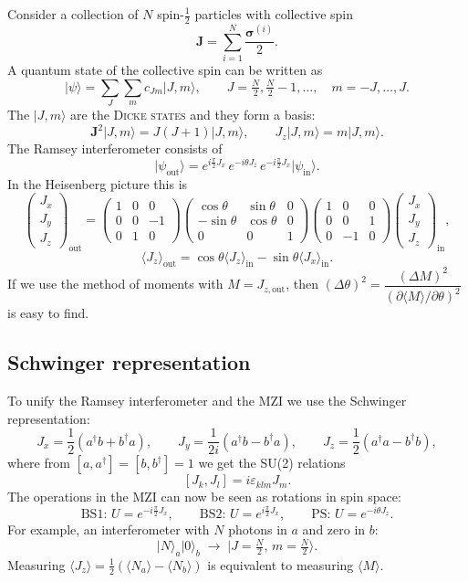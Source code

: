 \documentclass[11pt,a4paper]{article}
\newcommand{\ket}[1]{\lvert #1\rangle}
\newcommand{\expval}[1]{\langle #1\rangle}
\newcommand{\term}[1]{\textsc{#1}}
\begin{document}
Consider a collection of $N$ spin-$\frac12$ particles with collective spin
\[
  \mathbf J = \sum_{i=1}^N \frac{\bm\sigma^{(i)}}{2}.
\]
A quantum state of the collective spin can be written as
\[
  \ket\psi = \sum_J\sum_m c_{Jm}\ket{J,m}, \qquad J=\tfrac N2,\tfrac N2-1,\dots,\quad m=-J,\dots,J .
\]
The $\ket{J,m}$ are the \term{Dicke states} and they form a basis:
\[
  \mathbf J^2\ket{J,m} = J(J+1)\ket{J,m}, \qquad J_z\ket{J,m} = m\ket{J,m}.
\]
The Ramsey interferometer consists of
\[
  \ket{\psi_{\text{out}}} = e^{i\frac\pi2 J_x}\,e^{-i\theta J_z}\,e^{-i\frac\pi2 J_x}\ket{\psi_{\text{in}}}.
\]
In the Heisenberg picture this is
\[
  \begin{pmatrix}J_x\\J_y\\J_z\end{pmatrix}_{\text{out}}
  = \begin{pmatrix}1&0&0\\0&0&-1\\0&1&0\end{pmatrix}
    \begin{pmatrix}\cos\theta&\sin\theta&0\\-\sin\theta&\cos\theta&0\\0&0&1\end{pmatrix}
    \begin{pmatrix}1&0&0\\0&0&1\\0&-1&0\end{pmatrix}
    \begin{pmatrix}J_x\\J_y\\J_z\end{pmatrix}_{\text{in}},
\]
\[
  \expval{J_z}_{\text{out}} = \cos\theta\expval{J_z}_{\text{in}} - \sin\theta\expval{J_x}_{\text{in}} .
\]
If we use the method of moments with $M=J_{z,\text{out}}$, then $(\Delta\theta)^2=\dfrac{(\Delta M)^2}{(\partial\expval{M}/\partial\theta)^2}$ is easy to find.

\subsection{Schwinger representation}
To unify the Ramsey interferometer and the MZI we use the Schwinger representation:
\[
  J_x = \frac12\left(a^\dagger b + b^\dagger a\right),\qquad
  J_y = \frac1{2i}\left(a^\dagger b - b^\dagger a\right),\qquad
  J_z = \frac12\left(a^\dagger a - b^\dagger b\right),
\]
where from $[a,a^\dagger]=[b,b^\dagger]=1$ we get the SU(2) relations
\[
  [J_k,J_l] = i\varepsilon_{klm}J_m .
\]
The operations in the MZI can now be seen as rotations in spin space:
\[
  \text{BS1: } U=e^{-i\frac\pi2 J_x},\qquad
  \text{BS2: } U=e^{i\frac\pi2 J_x},\qquad
  \text{PS: } U=e^{-i\theta J_z}.
\]
For example, an interferometer with $N$ photons in $a$ and zero in $b$:
\[
  \ket{N}_a\ket{0}_b \;\to\; \ket{J=\tfrac N2,\,m=\tfrac N2}.
\]
Measuring $\expval{J_z}=\frac12\left(\expval{N_a}-\expval{N_b}\right)$ is equivalent to measuring $\expval{M}$.
\end{document}
